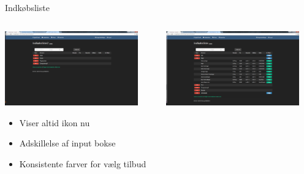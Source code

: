 \begin{frame}{Indkøbsliste}
	
	\begin{minipage}[0.3\textheight]{\textwidth}
	\begin{columns}[T]
	\begin{column}{0.5\textwidth}
	 \includegraphics[width=0.9\textwidth,height=0.8\textheight,keepaspectratio]{images/Screenshots/ShoppingListOld.png}
	 
	 \begin{itemize}
	 	\item Viser altid ikon nu
	 	\item Adskillelse af input bokse
	 	\item Konsistente farver for vælg tilbud
	 \end{itemize}
	 
	\end{column}
	\begin{column}{0.5\textwidth}
	 \includegraphics[width=0.9\textwidth,height=0.8\textheight,keepaspectratio]{images/Screenshots/ShoppingListOffersOld.png}
	 
	 \vspace{2 mm}
	  

\end{column}
\end{columns}
\end{minipage}
\end{frame}
